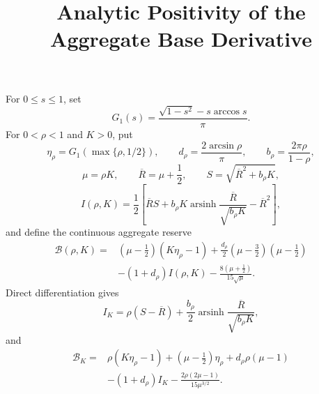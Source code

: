 \documentclass[11pt]{article}
\title{Analytic Positivity of the Aggregate Base Derivative}
\author{}
\date{}
\DeclareMathOperator{\arsinh}{arsinh}
\begin{document}
\maketitle

For \(0\leq s\leq1\), set
\[
 G_1(s)=\frac{\sqrt{1-s^2}-s\arccos s}{\pi}.
\]
For \(0<\rho<1\) and \(K>0\), put
\[
 \eta_\rho=G_1(\max\{\rho,1/2\}),\qquad
 d_\rho=\frac{2\arcsin\rho}{\pi},\qquad
 b_\rho=\frac{2\pi\rho}{1-\rho},
\]
\[
 \mu=\rho K,\qquad
 \overline R=\mu+\frac12,\qquad
 S=\sqrt{\overline R^2+b_\rho K},
\]
\[
 I(\rho,K)=\frac12\left[
 \overline R S+b_\rho K\arsinh
 \frac{\overline R}{\sqrt{b_\rho K}}-\overline R^2
 \right],
\]
and define the continuous aggregate reserve
\begin{equation}
\begin{aligned}
 \mathcal B(\rho,K)={}&
 (\mu-\tfrac12)(K\eta_\rho-1)
 +\frac{d_\rho}{2}(\mu-\tfrac32)(\mu-\tfrac12)\\
 &-(1+d_\rho)I(\rho,K)
 -\frac{8(\mu+\tfrac12)}{15\sqrt\mu}.
\end{aligned}
\label{cm:eq-B-def}
\end{equation}
Direct differentiation gives
\begin{equation}
 I_K=\rho(S-\overline R)
 +\frac{b_\rho}{2}\arsinh
 \frac{\overline R}{\sqrt{b_\rho K}},
\label{cm:eq-IK}
\end{equation}
and
\begin{equation}
\begin{aligned}
 \mathcal B_K={}&
 \rho(K\eta_\rho-1)+(\mu-\tfrac12)\eta_\rho
 +d_\rho\rho(\mu-1)\\
 &-(1+d_\rho)I_K
 -\frac{2\rho(2\mu-1)}{15\mu^{3/2}}.
\end{aligned}
\label{cm:eq-BK}
\end{equation}


\end{document}

